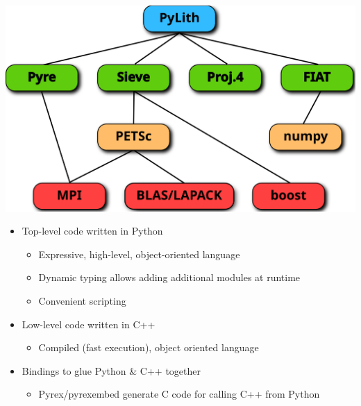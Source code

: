 \documentclass[pdftex,cig,slideColor]{pp4slides}
\begin{document}

  \vfill
  \begin{center}
    \includegraphics[scale=0.9]{figs/packages}
  \end{center}


  \begin{itemize}
  \item Top-level code written in Python
    \begin{itemize}
    \item Expressive, high-level, object-oriented language
    \item Dynamic typing allows adding additional modules at runtime
    \item Convenient scripting
    \end{itemize}
  \item Low-level code written in C++
    \begin{itemize}
    \item Compiled (fast execution), object oriented language
    \end{itemize}
  \item Bindings to glue Python \& C++ together
    \begin{itemize}
    \item Pyrex/pyrexembed generate C code for calling C++ from Python
    \end{itemize}
  \end{itemize}
\end{document}
